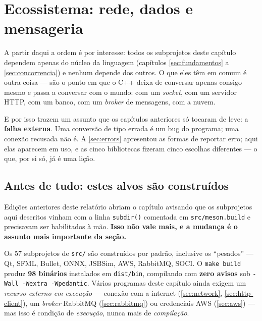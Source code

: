 
\section{Ecossistema: rede, dados e mensageria}
\label{sec:rede}

A partir daqui a ordem é por interesse: todos os subprojetos deste capítulo
dependem apenas do núcleo da linguagem (capítulos \ref{sec:fundamentos} a
\ref{sec:concorrencia}) e nenhum depende dos outros. O que eles têm em comum é
outra coisa --- são o ponto em que o C++ deixa de conversar apenas consigo mesmo
e passa a conversar com o mundo: com um \emph{socket}, com um servidor HTTP, com
um banco, com um \emph{broker} de mensagens, com a nuvem.

E por isso trazem um assunto que os capítulos anteriores só tocaram de leve: a
\textbf{falha externa}. Uma conversão de tipo errada é um bug do programa; uma
conexão recusada não é. A \cref{sec:errors} apresentou as formas de reportar
erro; aqui elas aparecem em uso, e as cinco bibliotecas fizeram cinco escolhas
diferentes --- o que, por si só, já é uma lição.

\subsection{Antes de tudo: estes alvos são construídos}

Edições anteriores deste relatório abriam o capítulo avisando que os
subprojetos aqui descritos vinham com a linha \texttt{subdir()} comentada em
\texttt{src/meson.build} e precisavam ser habilitados à mão. \textbf{Isso não
vale mais, e a mudança é o assunto mais importante da seção.}

\begin{regra}
Os 57 subprojetos de \texttt{src/} são construídos por padrão, inclusive os
``pesados'' --- Qt, SFML, Bullet, ONNX, JSBSim, AWS, RabbitMQ, SOCI. O
\texttt{make build} produz \textbf{98 binários} instalados em
\texttt{dist/bin}, compilando com \textbf{zero avisos} sob
\texttt{-Wall -Wextra -Wpedantic}. Vários programas deste capítulo ainda
exigem um \emph{recurso externo em execução} --- conexão com a internet
(\ref{sec:network}, \ref{sec:http-client}), um \emph{broker} RabbitMQ
(\ref{sec:rabbitmq}) ou credenciais AWS (\ref{sec:aws}) --- mas isso é
condição de \emph{execução}, nunca mais de \emph{compilação}.
\end{regra}

